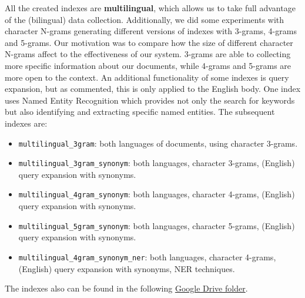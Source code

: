 All the created indexes are \textbf{multilingual}, which allows us to take full advantage of the (bilingual) data
collection.
Additionally, we did some experiments with character N-grams generating different versions of indexes with 3-grams,
4-grams and 5-grams.
Our motivation was to compare how the size of different character N-grams affect to the effectiveness of our system.
3-grams are able to collecting more specific information about our documents, while 4-grams and 5-grams are more open to
the context.
An additional functionality of some indexes is query expansion, but as commented, this is only applied to the English
body.
One index uses Named Entity Recognition which provides not only the search for keywords but also identifying and
extracting specific named entities.
The subsequent indexes are:
\begin{itemize}
	\item \texttt{multilingual\_3gram}: both languages of documents, using character 3-grams.
	\item \texttt{multilingual\_3gram\_synonym}: both languages, character 3-grams, (English) query expansion with synonyms.
	\item \texttt{multilingual\_4gram\_synonym}: both languages, character 4-grams, (English) query expansion with synonyms.
	\item \texttt{multilingual\_5gram\_synonym}: both languages, character 5-grams, (English) query expansion with synonyms.
	\item \texttt{multilingual\_4gram\_synonym\_ner}: both languages, character 4-grams, (English) query expansion with synonyms, NER techniques.
\end{itemize}

The indexes also can be found in the following
\href{https://drive.google.com/drive/folders/1CK_kLeZ5Us3VJe8hiG1vhwPrDs94cLvU?usp=share_link}{Google Drive folder}.\\

